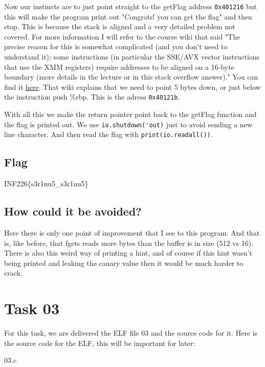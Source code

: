 \documentclass{article}
\begin{document}
Now our instincts are to just point straight to the getFlag address \lstinline{0x401216} but this will make the program print out "Congrats! you can get the flag" and then stop. This is because the stack is aligned and a very detailed problem not covered. For more information I will refer to the course wiki that said "The precise reason for this is somewhat complicated (and you don't need to understand it); some instructions (in particular the SSE/AVX vector instructions that use the XMM registers) require addresses to be aligned on a 16-byte boundary (more details in the lecture or in this stack overflow answer)." You can find it \href{https://git.app.uib.no/inf226/23h/inf226-23h/-/wikis/lectures/ROP#solving-the-system-crash}{here}. That wiki explains that we need to point 5 bytes down, or just below the instruction push \%rbp. This is the adress \lstinline{0x40121b}.

With all this we make the return pointer point back to the getFlag function and the flag is printed out. We use \lstinline{io.shutdown('out)} just to avoid sending a new line character. And then read the flag with \lstinline{print(io.readall())}.

\subsection{Flag}
INF226\{s3r1nu5\_s3r1nu5\}

\subsection{How could it be avoided?}
Here there is only one point of improvement that I see to this program. And that is, like before, that fgets reads more bytes than the buffer is in size (512 vs 16). There is also this weird way of printing a hint, and of course if this hint wasn't being printed and leaking the canary value then it would be much harder to crack.

\section{Task 03}
For this task, we are delivered the ELF file 03 and the source code for it.
Here is the source code for the ELF, this will be important for later:

{03.c}
\end{document}
